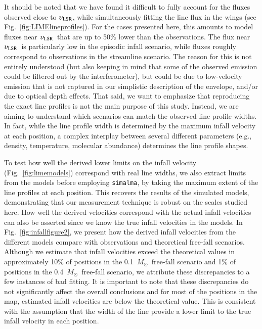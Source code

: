 \documentclass{aa}
\newcommand{\vlsr}{$\upsilon_{\rm LSR}$}              %
\newcommand{\msun}{\ensuremath{M_{\odot}}\xspace}
\begin{document}
It should be noted that we have found
it difficult to fully account for the fluxes observed close to \vlsr, while simultaneously fitting the line flux in the wings (see Fig.~\ref{fig:LIMElineprofiles}). For the cases presented here, this amounts to model fluxes near \vlsr\ that are up to 50\% lower than the observations. The flux near \vlsr\ is particularly low in the episodic infall scenario, while fluxes roughly correspond to observations in the streamline scenario. The reason for this is not entirely understood (but also keeping in mind that some of the observed emission could be filtered out by the interferometer), but could be due to low-velocity emission that is not captured in our simplistic description of the envelope, and/or due to optical depth effects. That said, we want to emphasize that reproducing the exact line profiles is not the main purpose of this study. Instead, we are aiming to understand which scenarios can match the observed line profile widths. In fact, while the line profile width is determined by the maximum infall velocity at each position, a complex interplay between several different parameters (e.g., density, temperature, molecular abundance) determines the line profile shapes.

To test how well the derived lower limits on the infall velocity (Fig.~\ref{fig:limemodels}) correspond with real line widths, we also extract limits from the models before employing \texttt{simalma}, by taking the maximum extent of the line profiles at each position. This recovers the results of the simulated models, demonstrating that our measurement technique is robust on the scales studied here. How well the derived velocities correspond with the actual infall velocities can also be asserted since we know the true infall velocities in the models. In Fig.~\ref{fig:infallfigure2}, we present how the derived infall velocities from the different models compare with observations and theoretical free-fall scenarios. Although we estimate that infall velocities exceed the theoretical values in approximately 10\% of positions in the 0.1~\msun\ free-fall scenario and 1\% of positions in the 0.4~\msun\ free-fall scenario, we attribute these discrepancies to a few instances of bad fitting. It is important to note that these discrepancies do not significantly affect the overall conclusions and for most of the positions in the map, estimated infall velocities are below the theoretical value. This is consistent with the assumption that the width of the line provide a lower limit to the true infall velocity in each position.
\end{document}
